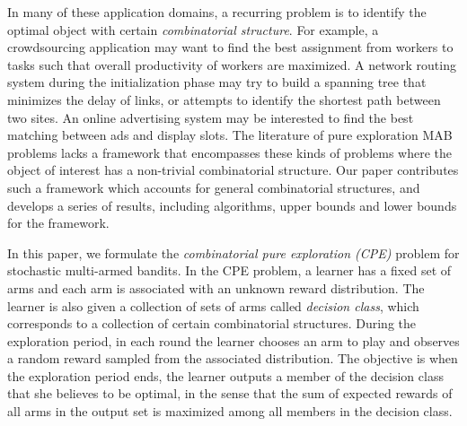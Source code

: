 \documentclass{article}
\newcommand{\Problem}{{CPE}\xspace}
\begin{document}
In many  of these application domains, a recurring problem is to identify the optimal object with certain \emph{combinatorial structure}. 
For example, a crowdsourcing application may want to find the best assignment from workers to tasks such that overall productivity of workers are maximized. 
A network routing system during the initialization phase may try to build a spanning tree that minimizes the delay of links, or attempts to identify the shortest path between two sites.  
An online advertising system may be interested to find the best matching between ads and display slots. 
The literature of pure exploration MAB problems lacks a framework that encompasses these kinds of problems where the object of interest has a non-trivial combinatorial structure.  
Our paper contributes such a framework which accounts for general combinatorial structures, and develops a series of results, including algorithms, upper bounds and lower bounds for the framework.

In this paper, we formulate the {\em combinatorial pure exploration (\Problem)} problem for stochastic multi-armed bandits.  
In the \Problem problem, a learner has a fixed set of arms and each arm is associated with an unknown reward distribution. 
The learner is also given a collection of sets of arms called \emph{decision class}, which
	corresponds to  a collection of certain combinatorial structures.
During the exploration period, in each round the learner chooses an arm to play
	and observes a random reward sampled from the associated distribution. 
The objective is when the exploration period ends, the learner outputs a member of the decision
	class that she believes to be optimal, in the sense that the sum of expected rewards of all arms
	in the output set is maximized among all members in the decision class.
\end{document}
